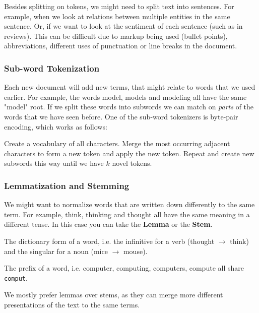 Besides splitting on tokens, we might need to split text into
sentences. For example,
when we look at relations between multiple entities in the same
sentence. Or, if we want
to look at the sentiment of each sentence (such as in reviews). This
can be difficult due
to markup being used (bullet points), abbreviations, different uses
of punctuation or line
breaks in the document.

\subsubsection{Sub-word Tokenization}

Each new document will add new terms, that might relate to words that
we used earlier. For
example, the words model, models and modeling all have the same
"model" root. If we split these
words into subwords we can match on \textit{parts} of the words that
we have seen before.
One of the sub-word tokenizers is byte-pair encoding, which works as follows:

\begin{definition}
  Create a vocabulary of all characters. Merge the most occurring
  adjacent characters to form a new token
  and apply the new token. Repeat and create new subwords this way
  until we have $k$ novel tokens.
\end{definition}

\subsubsection{Lemmatization and Stemming}

We might want to normalize words that are written down differently to
the same term. For example, think, thinking and thought all have the same
meaning in a different tense. In this case you can take the \textbf{Lemma}
or the \textbf{Stem}.

\begin{definition}[Lemma]
  The dictionary form of a word, i.e. the infinitive for a verb
  (thought $\rightarrow$ think) and the singular for a noun (mice
  $\rightarrow$ mouse).
\end{definition}

\begin{definition}[Stem]
  The prefix of a word, i.e. computer, computing, computers, compute
  all share \texttt{comput}.
\end{definition}

We mostly prefer lemmas over stems, as they can merge more different
presentations
of the text to the same terms.


